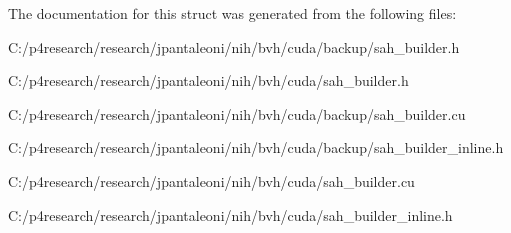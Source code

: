 \-The documentation for this struct was generated from the following files\-:\begin{DoxyCompactItemize}
\item 
\-C\-:/p4research/research/jpantaleoni/nih/bvh/cuda/backup/sah\-\_\-builder.\-h\item 
\-C\-:/p4research/research/jpantaleoni/nih/bvh/cuda/sah\-\_\-builder.\-h\item 
\-C\-:/p4research/research/jpantaleoni/nih/bvh/cuda/backup/sah\-\_\-builder.\-cu\item 
\-C\-:/p4research/research/jpantaleoni/nih/bvh/cuda/backup/sah\-\_\-builder\-\_\-inline.\-h\item 
\-C\-:/p4research/research/jpantaleoni/nih/bvh/cuda/sah\-\_\-builder.\-cu\item 
\-C\-:/p4research/research/jpantaleoni/nih/bvh/cuda/sah\-\_\-builder\-\_\-inline.\-h\end{DoxyCompactItemize}

